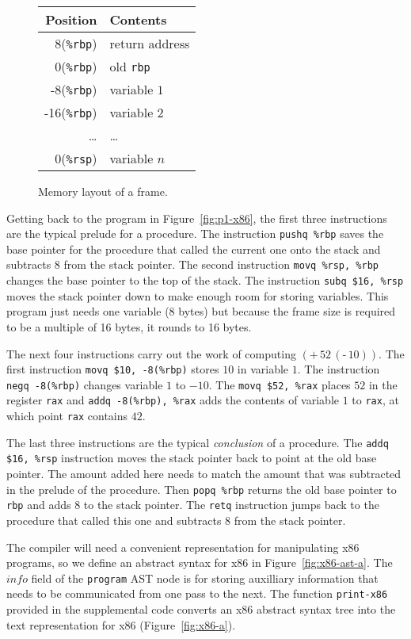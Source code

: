 \documentclass[12pt]{book}
\newcommand{\itm}[1]{\ensuremath{\mathit{#1}}}
\newcommand{\key}[1]{\texttt{#1}}
\newcommand{\UNIOP}[2]{(\key{#1}\,#2)}
\newcommand{\BINOP}[3]{(\key{#1}\,#2\,#3)}
\begin{document}
\begin{figure}
\centering
\begin{tabular}{|r|l|} \hline
Position & Contents \\ \hline
8(\key{\%rbp}) & return address \\
0(\key{\%rbp}) & old \key{rbp} \\
-8(\key{\%rbp}) & variable $1$ \\
-16(\key{\%rbp}) & variable $2$ \\
 \ldots  & \ldots \\
0(\key{\%rsp}) & variable $n$\\ \hline
\end{tabular}

\caption{Memory layout of a frame.}
\label{fig:frame}
\end{figure}

Getting back to the program in Figure~\ref{fig:p1-x86}, the first
three instructions are the typical prelude for a procedure.  The
instruction \key{pushq \%rbp} saves the base pointer for the procedure
that called the current one onto the stack and subtracts $8$ from the
stack pointer. The second instruction \key{movq \%rsp, \%rbp} changes
the base pointer to the top of the stack. The instruction \key{subq
  \$16, \%rsp} moves the stack pointer down to make enough room for
storing variables.  This program just needs one variable ($8$ bytes)
but because the frame size is required to be a multiple of 16 bytes,
it rounds to 16 bytes.

The next four instructions carry out the work of computing
$\BINOP{+}{52}{\UNIOP{-}{10} }$. The first instruction \key{movq \$10,
  -8(\%rbp)} stores $10$ in variable $1$. The instruction \key{negq
  -8(\%rbp)} changes variable $1$ to $-10$. The \key{movq \$52, \%rax}
places $52$ in the register \key{rax} and \key{addq -8(\%rbp), \%rax}
adds the contents of variable $1$ to \key{rax}, at which point
\key{rax} contains $42$.

The last three instructions are the typical \emph{conclusion} of a
procedure.  The \key{addq \$16, \%rsp} instruction moves the stack
pointer back to point at the old base pointer. The amount added here
needs to match the amount that was subtracted in the prelude of the
procedure.  Then \key{popq \%rbp} returns the old base pointer to
\key{rbp} and adds $8$ to the stack pointer.  The \key{retq}
instruction jumps back to the procedure that called this one and
subtracts 8 from the stack pointer.

The compiler will need a convenient representation for manipulating
x86 programs, so we define an abstract syntax for x86 in
Figure~\ref{fig:x86-ast-a}. The \itm{info} field of the \key{program}
AST node is for storing auxilliary information that needs to be
communicated from one pass to the next. The function \key{print-x86}
provided in the supplemental code converts an x86 abstract syntax tree
into the text representation for x86 (Figure~\ref{fig:x86-a}).
\end{document}
